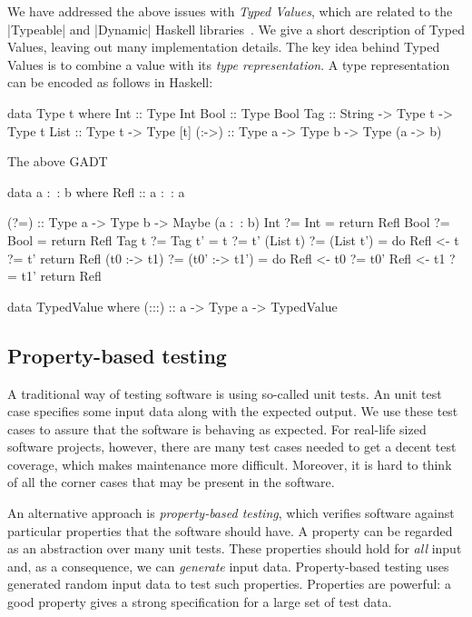 \documentclass{article}
\begin{document}
We have addressed the above issues with \emph{Typed Values}, which are related
to the |Typeable| and |Dynamic| Haskell libraries~\cite{DataDynamic}. We give a
short description of Typed Values, leaving out many implementation details. The
key idea behind Typed Values is to combine a value with its \emph{type
representation}. A type representation can be encoded as follows in Haskell:
\begin{haskellcode}
data Type t where
  Int   :: Type Int
  Bool  :: Type Bool
  Tag   :: String -> Type t -> Type t
  List  :: Type t -> Type [t]
  (:->) :: Type a -> Type b -> Type (a -> b)
\end{haskellcode}
The above GADT 
\begin{haskellcode}
data a :~: b where
  Refl :: a :~: a

(?=) :: Type a -> Type b -> Maybe (a :~: b)
Int          ?= Int        = return Refl
Bool         ?= Bool       = return Refl
Tag t        ?= Tag t'     = t ?= t'
(List t)     ?= (List t')  = do
  Refl <- t ?= t'
  return Refl
(t0 :-> t1)  ?= (t0' :-> t1') = do
  Refl <- t0 ?= t0'
  Refl <- t1 ?= t1'
  return Refl
\end{haskellcode}

\begin{haskellcode}
data TypedValue where
  (:::) :: a -> Type a -> TypedValue
\end{haskellcode}


\subsection{Property-based testing}
A traditional way of testing software is using so-called unit tests. An unit
test case specifies some input data along with the expected output. We use these
test cases to assure that the software is behaving as expected. For real-life
sized software projects, however, there are many test cases needed to get a
decent test coverage, which makes maintenance more difficult. Moreover, it is
hard to think of all the corner cases that may be present in the software.

An alternative approach is \emph{property-based testing}, which verifies
software against particular properties that the software should have. A property
can be regarded as an abstraction over many unit tests. These properties should
hold for \emph{all} input and, as a consequence, we can \emph{generate} input
data. Property-based testing uses generated random input data to test such
properties. Properties are powerful: a good property gives a strong
specification for a large set of test data. 
\end{document}
